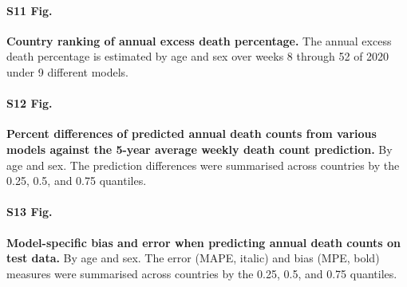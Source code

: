 \documentclass[10pt,letterpaper]{article}
\begin{document}
\paragraph*{S11 Fig.}
\label{S11_Fig}
{\bf Country ranking of annual excess death percentage.} The annual excess death percentage is estimated by age and sex over weeks 8 through 52 of 2020 under 9 different models.

\paragraph*{S12 Fig.}
\label{S12_Fig}
{\bf Percent differences of predicted annual death counts from various models against the 5-year average weekly death count prediction.} By age and sex. The prediction differences were summarised across countries by the 0.25, 0.5, and 0.75 quantiles.

\paragraph*{S13 Fig.}
\label{S13_Fig}
{\bf Model-specific bias and error when predicting annual death counts on test data.} By age and sex. The error (MAPE, italic) and bias (MPE, bold) measures were summarised across countries by the 0.25, 0.5, and 0.75 quantiles.


\nolinenumbers



%
%
%




\end{document}

